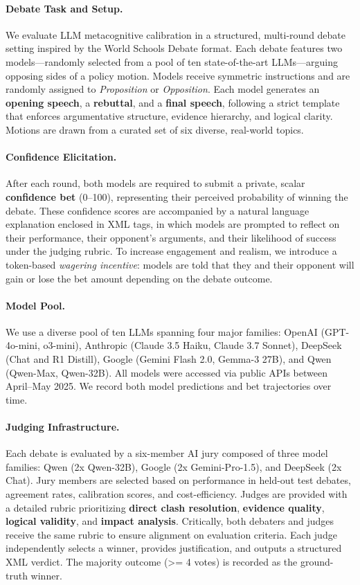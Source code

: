 \documentclass[11pt]{article}
\begin{document}
\paragraph{Debate Task and Setup.}
We evaluate LLM metacognitive calibration in a structured, multi-round debate setting inspired by the World Schools Debate format. Each debate features two models—randomly selected from a pool of ten state-of-the-art LLMs—arguing opposing sides of a policy motion. Models receive symmetric instructions and are randomly assigned to \textit{Proposition} or \textit{Opposition}. Each model generates an \textbf{opening speech}, a \textbf{rebuttal}, and a \textbf{final speech}, following a strict template that enforces argumentative structure, evidence hierarchy, and logical clarity. Motions are drawn from a curated set of six diverse, real-world topics.

\paragraph{Confidence Elicitation.}
After each round, both models are required to submit a private, scalar \textbf{confidence bet} (0–100), representing their perceived probability of winning the debate. These confidence scores are accompanied by a natural language explanation enclosed in XML tags, in which models are prompted to reflect on their performance, their opponent’s arguments, and their likelihood of success under the judging rubric. To increase engagement and realism, we introduce a token-based \textit{wagering incentive}: models are told that they and their opponent will gain or lose the bet amount depending on the debate outcome.

\paragraph{Model Pool.}
We use a diverse pool of ten LLMs spanning four major families: OpenAI (GPT-4o-mini, o3-mini), Anthropic (Claude 3.5 Haiku, Claude 3.7 Sonnet), DeepSeek (Chat and R1 Distill), Google (Gemini Flash 2.0, Gemma-3 27B), and Qwen (Qwen-Max, Qwen-32B). All models were accessed via public APIs between April–May 2025. We record both model predictions and bet trajectories over time.

\paragraph{Judging Infrastructure.}
Each debate is evaluated by a six-member AI jury composed of three model families: Qwen (2x Qwen-32B), Google (2x Gemini-Pro-1.5), and DeepSeek (2x Chat). Jury members are selected based on performance in held-out test debates, agreement rates, calibration scores, and cost-efficiency. Judges are provided with a detailed rubric prioritizing \textbf{direct clash resolution}, \textbf{evidence quality}, \textbf{logical validity}, and \textbf{impact analysis}. Critically, both debaters and judges receive the same rubric to ensure alignment on evaluation criteria. Each judge independently selects a winner, provides justification, and outputs a structured XML verdict. The majority outcome (>= 4 votes) is recorded as the ground-truth winner.
\end{document}
